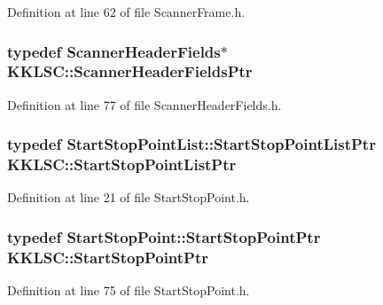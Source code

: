 Definition at line 62 of file Scanner\+Frame.\+h.

\subsubsection[{\texorpdfstring{Scanner\+Header\+Fields\+Ptr}{ScannerHeaderFieldsPtr}}]{\setlength{\rightskip}{0pt plus 5cm}typedef {\bf Scanner\+Header\+Fields}$\ast$ {\bf K\+K\+L\+S\+C\+::\+Scanner\+Header\+Fields\+Ptr}}\hypertarget{namespace_k_k_l_s_c_a7c06efc9062d7120e1fbf26f44ce4089}{}\label{namespace_k_k_l_s_c_a7c06efc9062d7120e1fbf26f44ce4089}


Definition at line 77 of file Scanner\+Header\+Fields.\+h.

\subsubsection[{\texorpdfstring{Start\+Stop\+Point\+List\+Ptr}{StartStopPointListPtr}}]{\setlength{\rightskip}{0pt plus 5cm}typedef {\bf Start\+Stop\+Point\+List\+::\+Start\+Stop\+Point\+List\+Ptr} {\bf K\+K\+L\+S\+C\+::\+Start\+Stop\+Point\+List\+Ptr}}\hypertarget{namespace_k_k_l_s_c_adbe6cf94c19379a2ceb7a9f6d6188702}{}\label{namespace_k_k_l_s_c_adbe6cf94c19379a2ceb7a9f6d6188702}


Definition at line 21 of file Start\+Stop\+Point.\+h.

\subsubsection[{\texorpdfstring{Start\+Stop\+Point\+Ptr}{StartStopPointPtr}}]{\setlength{\rightskip}{0pt plus 5cm}typedef {\bf Start\+Stop\+Point\+::\+Start\+Stop\+Point\+Ptr} {\bf K\+K\+L\+S\+C\+::\+Start\+Stop\+Point\+Ptr}}\hypertarget{namespace_k_k_l_s_c_ad7242c9e21790e237095cdd24ce21361}{}\label{namespace_k_k_l_s_c_ad7242c9e21790e237095cdd24ce21361}


Definition at line 75 of file Start\+Stop\+Point.\+h.

